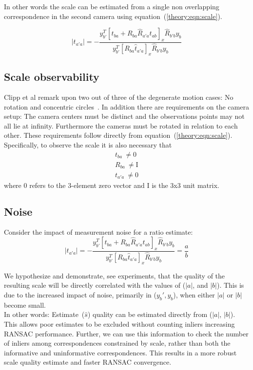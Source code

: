 In other words the scale can be estimated from a single non overlapping correspondence in the second camera using equation~(\ref{theory:eqn:scale}). 

\begin{equation}
\label{theory:eqn:scale}
|t_{a'a}|=-\frac{y_{b'}^T[t_{ba} + R_{ba}\hat{R}_{a'a}t_{ab}]_x\hat{R}_{b'b}y_b}{y_{b'}^T[R_{ba}\hat{t}_{a'a}]_x\hat{R}_{b'b}y_b}
\end{equation}


\subsection{Scale observability}

Clipp et al remark upon two out of three of the degenerate motion cases: No rotation and concentric circles~\cite{clipp2008robust}. In addition there are requirements on the camera setup: The camera centers must be distinct and the observations points may not all lie at infinity. Furthermore the cameras must be rotated in relation to each other. These requirements follow directly from equation~(\ref{theory:eqn:scale}). Specifically, to observe the scale it is also necessary that
\begin{eqnarray}
t_{ba}~\neq \mathrm{0} \\
R_{ba}~\neq \mathrm{I} \\
t_{a'a}~\neq \mathrm{0}
\end{eqnarray}
where $\mathrm{0}$ refers to the 3-element zero vector and $\mathrm{I}$ is the 3x3 unit matrix.


\subsection{Noise}
Consider the impact of measurement noise for a ratio estimate: 
\begin{equation}
|t_{a'a}| = -\frac{y_{b'}^T[t_{ba} + R_{ba}\hat{R}_{a'a}t_{ab}]_x\hat{R}_{b'b}y_b}{y_{b'}^T[R_{ba}\hat{t}_{a'a}]_x\hat{R}_{b'b}y_b} =\frac{a}{b}
\end{equation}

We hypothesize and demonstrate, see experiments, that the quality of the resulting scale will be directly correlated with the values of ($|a|$, and $|b|$). This is due to the increased impact of noise, primarily in ($y_b',y_b$), when either $|a|$ or $|b|$ become small. \\

In other words: Estimate~($\hat{s}$) quality can be estimated directly from ($|a|$, $|b|$). This allows poor estimates to be excluded without counting inliers increasing RANSAC performance. Further, we can use this information to check the number of inliers among correspondences constrained by scale, rather than both the informative and uninformative correspondences. This results in a more robust scale quality estimate and faster RANSAC convergence. 

